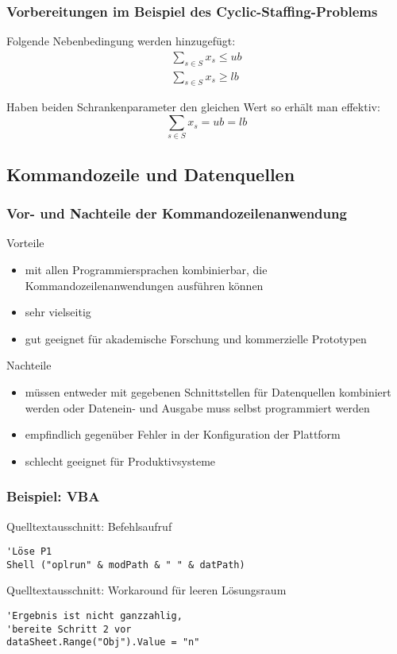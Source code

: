 \begin{frame}
 \frametitle{Vorbereitungen im Beispiel des Cyclic-Staffing-Problems}
 Folgende Nebenbedingung werden hinzugefügt:
 \begin{gather*}
  \sum_{s\in S}x_s \leq ub\label{eq:CyclicStaffingUB}\\
  \sum_{s\in S}x_s \geq lb\label{eq:CyclicStaffingLB}
 \end{gather*}
 
 Haben beiden Schrankenparameter den gleichen Wert so erhält man effektiv:
 \[
  \sum_{s\in S}x_s = ub = lb
 \]
\end{frame}

\subsection{Kommandozeile und Datenquellen}
\begin{frame}
 \frametitle{Vor- und Nachteile der Kommandozeilenanwendung}
 \footnotesize
 \begin{block}{Vorteile}
  \begin{itemize}
   \item mit allen Programmiersprachen kombinierbar, die Kommandozeilenanwendungen ausführen können
   \item sehr vielseitig
   \item gut geeignet für akademische Forschung und kommerzielle Prototypen
  \end{itemize}
 \end{block}
 \pause
 \begin{block}{Nachteile}
  \begin{itemize}
   \item müssen entweder mit gegebenen Schnittstellen für Datenquellen kombiniert werden oder Datenein- und Ausgabe muss selbst programmiert werden
   \item empfindlich gegenüber Fehler in der Konfiguration der Plattform
   \item schlecht geeignet für Produktivsysteme
  \end{itemize}
 \end{block}
\end{frame}

\begin{frame}[fragile]
 \frametitle{Beispiel: VBA}
 \begin{block}{Quelltextausschnitt: Befehlsaufruf}
  \begin{lstlisting}[language={[Visual]Basic},showstringspaces=false,numbers=none,basictype=\scriptsize\ttfamily]
'Löse P1
Shell ("oplrun" & modPath & " " & datPath)
  \end{lstlisting}
 \end{block}
 \begin{block}{Quelltextausschnitt: Workaround für leeren Lösungsraum}
    \begin{lstlisting}[language={[Visual]Basic},showstringspaces=false]
'Ergebnis ist nicht ganzzahlig, 
'bereite Schritt 2 vor
dataSheet.Range("Obj").Value = "n"
  \end{lstlisting}
 \end{block}
\end{frame}


